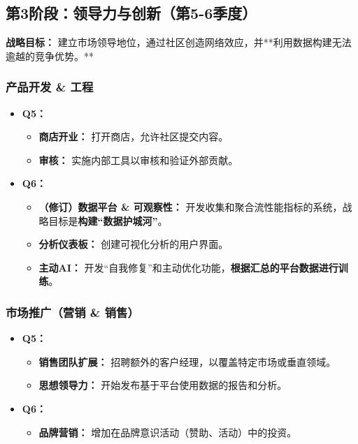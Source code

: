 \documentclass[11pt, a4paper, oneside]{article}
\begin{document}
\subsection{第3阶段：领导力与创新（第5-6季度）}
\textbf{战略目标：} 建立市场领导地位，通过社区创造网络效应，并**利用数据构建无法逾越的竞争优势。**

\subsubsection*{产品开发 \& 工程}
\begin{itemize}[leftmargin=*]
    \item \textbf{Q5：}
    \begin{itemize}
        \item \textbf{商店开业：} 打开商店，允许社区提交内容。
        \item \textbf{审核：} 实施内部工具以审核和验证外部贡献。
    \end{itemize}
    \item \textbf{Q6：}
    \begin{itemize}
        \item \textbf{（修订）数据平台 \& 可观察性：} 开发收集和聚合流性能指标的系统，战略目标是\textbf{构建“数据护城河”}。
        \item \textbf{分析仪表板：} 创建可视化分析的用户界面。
        \item \textbf{主动AI：} 开发“自我修复”和主动优化功能，\textbf{根据汇总的平台数据进行训练}。
    \end{itemize}
\end{itemize}

\subsubsection*{市场推广（营销 \& 销售）}
\begin{itemize}[leftmargin=*]
    \item \textbf{Q5：}
    \begin{itemize}
        \item \textbf{销售团队扩展：} 招聘额外的客户经理，以覆盖特定市场或垂直领域。
        \item \textbf{思想领导力：} 开始发布基于平台使用数据的报告和分析。
    \end{itemize}
    \item \textbf{Q6：}
    \begin{itemize}
        \item \textbf{品牌营销：} 增加在品牌意识活动（赞助、活动）中的投资。
    \end{itemize}
\end{itemize}
\end{document}
